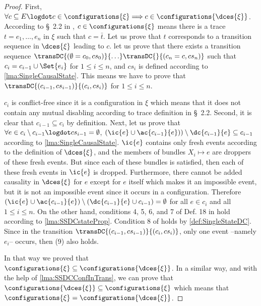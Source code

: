 \documentclass[runningheads,a4paper]{llncs}
\begin{document}
\begin{proof}
First, $\forall c \subseteq E \logdot c\in \configurations{\xi}
\Longrightarrow c\in \configurations{\dces{\xi}}$. According to \S~2.2 in \cite{dynamicCausality15},
$c\in \configurations{\xi}$ means there is a trace $t = e_1,\ldots,e_n$ in $\xi$
such that $c = \bar{t}$. Let us prove that $t$ corresponds to a transition
sequence in $\dces{\xi}$ leading to $c$. \ie let us prove that there exists a
transition sequence $\transDC{(\emptyset = c_0, cs_0)} {\ldots} \transDC {}{(c_n = c,
cs_n)}$ such that $c_i = c_{i-1} \cup \Set{e_i}$ for $1 \leq i \leq n$, and
$cs_i$ is defined according to \lem\ref{lma:SingleCausalState}. This means we have
to prove that $\transDC{(c_{i-1}, cs_{i-1})} {(c_i, cs_i)}$ for $1 \leq i \leq
n$.

$c_i$ is conflict-free since it is a configuration in $\xi$ which means that it does not contain any mutual
disabling according to trace definition in \S~2.2. Second, it is clear
that $c_{i-1} \subseteq c_i$ by definition. Next, let us prove that
$\forall e\in c_i\setminus c_{i-1} \logdot cs_{i-1} = \emptyset$, \ie
$\left(\ic{e} \cup \ac{c_{i-1}}{e})\right) \setminus \dc{c_{i-1}}{e} \subseteq c_{i-1}$ according
to \lem\ref{lma:SingleCausalState}.
$\ic{e}$ contains only fresh events according to the definition of $\dces{\xi}$,
and the members of bundles $X_i\mapsto e$ are droppers of these fresh events.
But since each of these bundles is satisfied, then each of these fresh events in
$\ic{e}$ is dropped. Furthermore, there cannot be added causality in $\dces{\xi}$
for $e$ except for $e$ itself which makes it an impossible event, but it is not an impossible event since it occurs in a
configuration. Therefore $\left(\ic{e} \cup
\ac{c_{i-1}}{e}\right) \setminus \left(\dc{c_{i-1}}{e} \cup c_{i-1}\right)=\emptyset$ for
all $e \in c_i$ and all $1\leq i \leq n$. On the other hand, conditions
4, 5, 6, and 7 of
Def. 18 in \cite{dynamicCausality15} hold according to \lem\ref{lma:SSDCstateProp}.
Condition 8 of  holds by \ref{def:SingleStateDC}.
Since in the transition $\transDC {(c_{i-1}, cs_{i-1})} {(c_i, cs_i)}$, only one
event --namely $e_i$-- occurs, then (9) also holds.

In that way we proved that $\configurations{\xi}\subseteq
\configurations{\dces{\xi}}$. In a similar way, and with the help of
\lem\ref{lma:SSDCConfInTrans}, we can prove that
$\configurations{\dces{\xi}}\subseteq \configurations{\xi}$ which means that $\configurations{\xi}= \configurations{\dces{\xi}}$.
\end{proof}
\end{document}
